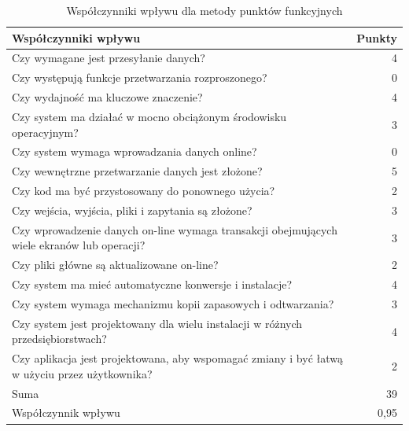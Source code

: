\documentclass{mwrep}
\begin{document}
\begin{table}
    \caption{Współczynniki wpływu dla metody punktów funkcyjnych}
    \begin{center}
        \begin{tabular}{|p{10cm}|r|} \hline
        \multicolumn{1}{|m{10cm}|}{\centering Współczynniki wpływu }                                           &
        \multicolumn{1}{m{2cm}|}{\centering Punkty}                                                            \\ \hline

        Czy wymagane jest przesyłanie danych?                                                           & 4    \\
        Czy występują funkcje przetwarzania rozproszonego?                                              & 0    \\
        Czy wydajność ma kluczowe znaczenie?                                                            & 4    \\
        Czy system ma działać w mocno obciążonym środowisku operacyjnym?                                & 3    \\
        Czy system wymaga wprowadzania danych online?                                                   & 0    \\
        Czy wewnętrzne przetwarzanie danych jest złożone?                                               & 5    \\
        Czy kod ma być przystosowany do ponownego użycia?                                               & 2    \\
        Czy wejścia, wyjścia, pliki i zapytania są złożone?                                             & 3    \\
        Czy wprowadzenie danych on-line wymaga transakcji obejmujących wiele ekranów lub operacji?      & 3    \\
        Czy pliki główne są aktualizowane on-line?                                                      & 2    \\
        Czy system ma mieć automatyczne konwersje i instalacje?                                         & 4    \\
        Czy system wymaga mechanizmu kopii zapasowych i odtwarzania?                                    & 3    \\
        Czy system jest projektowany dla wielu instalacji w różnych przedsiębiorstwach?                 & 4    \\
        Czy aplikacja jest projektowana, aby wspomagać zmiany i być łatwą w użyciu przez użytkownika?   & 2    \\ \hline
        \hfill Suma                                                                                     & 39   \\ \hline
        \hfill Współczynnik wpływu                                                                      & 0,95 \\ \hline

        \end{tabular}
    \end{center}
\end{table}
\end{document}
